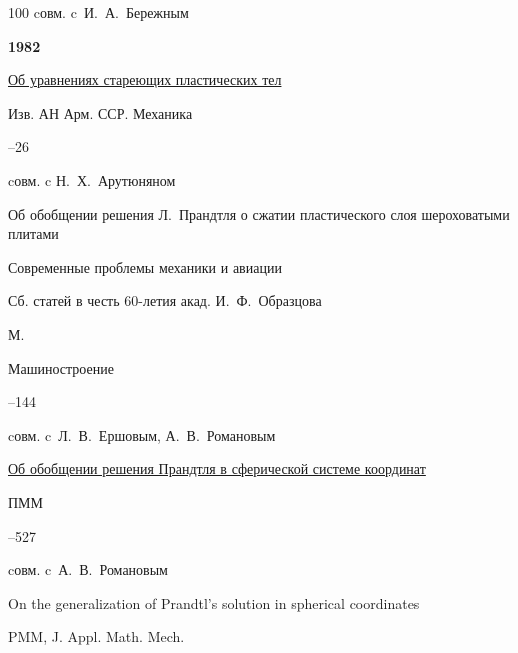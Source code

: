 \begin{thebibliography}{100}
\miscnote cовм. c~И.~А.~Бережным



\item[] \centerline{\bf 1982}




\paper  \href{https://zbmath.org/?q=an:0513.73041}{Об уравнениях стареющих пластических тел} 

\jour Изв. АН Арм. ССР. Механика




–26

\miscnote cовм. c Н.~Х.~Арутюняном





\paper Об обобщении решения Л.~Прандтля о сжатии пластического слоя шероховатыми плитами 

\inbook Современные проблемы механики и авиации

\bookinfo Сб. статей в честь 60-летия акад. И.~Ф.~Образцова

\publaddr М.

\publ Машиностроение


–144 

\miscnote cовм. c~Л.~В.~Ершовым, А.~В.~Романовым






\paper \href{https://zbmath.org/?q=an:0542.73038}{Об обобщении решения Прандтля в сферической системе координат}

\jour ПММ




–527 

\miscnote cовм. c~А.~В.~Романовым


\transl


\paper On the generalization of Prandtl’s solution in spherical coordinates

\jour PMM, J. Appl. Math. Mech.


\end{thebibliography}
